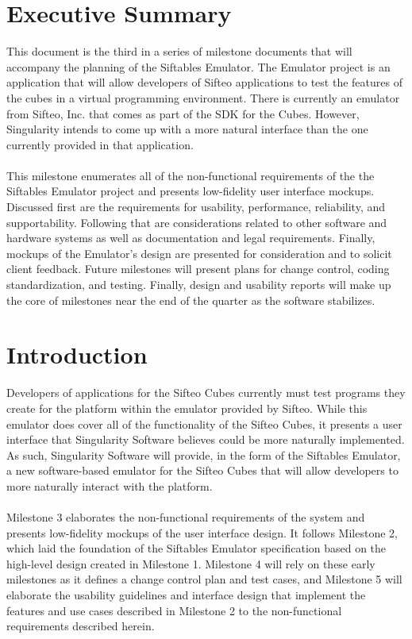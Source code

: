 \documentclass[12pt]{article}
\begin{document}
\section{Executive Summary}
This document is the third in a series of milestone documents that will accompany the planning of the Siftables Emulator. The Emulator project is an application that will allow developers of Sifteo applications to test the features of the cubes in a virtual programming environment. There is currently an emulator from Sifteo, Inc. that comes as part of the \gls{SDK} for the Cubes. However, Singularity intends to come up with a more natural interface than the one currently provided in that application.\\\\
This milestone enumerates all of the non-functional requirements of the the Siftables Emulator project and presents low-fidelity user interface mockups. Discussed first are the requirements for usability, performance, reliability, and supportability. Following that are considerations related to other software and hardware systems as well as documentation and legal requirements. Finally, mockups of the Emulator's design are presented for consideration and to solicit client feedback.  Future milestones will present plans for change control, coding standardization, and testing. Finally, design and usability reports will make up the core of milestones near the end of the quarter as the software stabilizes.


\section{Introduction}
Developers of applications for the \gls{Sifteo Cubes} currently must test programs they create for the platform within the emulator provided by Sifteo. While this emulator does cover all of the functionality of the Sifteo Cubes, it presents a user interface that Singularity Software believes could be more naturally implemented. As such, Singularity Software will provide, in the form of the Siftables Emulator, a new software-based emulator for the Sifteo Cubes that will allow developers to more naturally interact with the platform.\\\\
Milestone 3 elaborates the non-functional requirements of the system and presents low-fidelity mockups of the user interface design. It follows Milestone 2, which laid the foundation of the Siftables Emulator specification based on the high-level design created in Milestone 1. Milestone 4 will rely on these early milestones as it defines a change control plan and test cases, and Milestone 5 will elaborate the usability guidelines and interface design that implement the features and use cases described in Milestone 2 to the non-functional requirements described herein.
\end{document}
